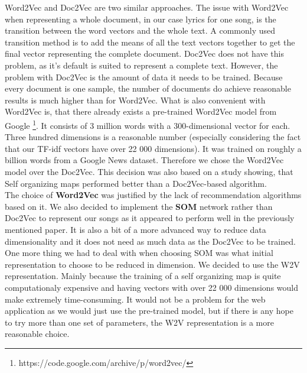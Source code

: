 Word2Vec and Doc2Vec are two similar approaches. The issue with Word2Vec when representing a whole document, in our case lyrics for one song, is the transition between the word vectors and the whole text. A commonly used transition method is to add the means of all the text vectors together to get the final vector representing the complete document. Doc2Vec does not have this problem, as it's default is suited to represent a complete text. However, the problem with Doc2Vec is the amount of data it needs to be trained. Because every document is one sample, the number of documents do achieve reasonable results is much higher than for Word2Vec. What is also convenient with Word2Vec is, that there already exists a pre-trained Word2Vec model from Google \footnote{https://code.google.com/archive/p/word2vec/}. It consists of 3 million words with a 300-dimensional vector for each. Three hundred dimensions is a reasonable number (especially considering the fact that our TF-idf vectors have over 22 000 dimensions). It was trained on roughly a billion words from a Google News dataset. Therefore we chose the Word2Vec model over the Doc2Vec. This decision was also based on a study \cite{inproceedings} showing, that Self organizing maps performed better than a Doc2Vec-based algorithm. \\

The choice of \textbf{Word2Vec} was justified by the lack of recommendation algorithms based on it. We also decided to implement the \textbf{SOM} network rather than Doc2Vec to represent our songs as it appeared to perform well in the previously mentioned paper. It is also a bit of a more advanced way to reduce data dimensionality and it does not need as much data as the Doc2Vec to be trained. One more thing we had to deal with when choosing SOM was what initial representation to choose to be reduced in dimension. We decided to use the W2V representation. Mainly because the training of a self organizing map is quite computationaly expensive and having vectors with over 22 000 dimensions would make extremely time-consuming. It would not be a problem for the web application as we would just use the pre-trained model, but if there is any hope to try more than one set of parameters, the W2V representation is a more reasonable choice.

